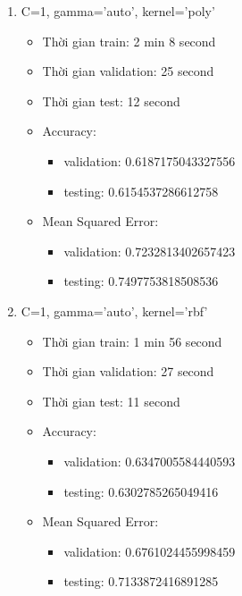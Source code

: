 \documentclass{article}
\begin{document}
\begin{enumerate}
	\item C=1, gamma='auto', kernel='poly'
	      \begin{itemize}
		      \item Thời gian train: 2 min 8 second
		      \item Thời gian validation: 25 second
		      \item Thời gian test: 12 second
		      \item Accuracy:
		            \begin{itemize}
			            \item validation: 0.6187175043327556
			            \item testing: 0.6154537286612758
		            \end{itemize}
		      \item Mean Squared Error:
		            \begin{itemize}
			            \item validation: 0.7232813402657423
			            \item testing: 0.7497753818508536
		            \end{itemize}
	      \end{itemize}
	\item C=1, gamma='auto', kernel='rbf'
	      \begin{itemize}
		      \item Thời gian train: 1 min 56 second
		      \item Thời gian validation: 27 second
		      \item Thời gian test: 11 second
		      \item Accuracy:
		            \begin{itemize}
			            \item validation: 0.6347005584440593
			            \item testing: 0.6302785265049416
		            \end{itemize}
		      \item Mean Squared Error:
		            \begin{itemize}
			            \item validation: 0.6761024455998459
			            \item testing: 0.7133872416891285
		            \end{itemize}
		            \begin{figure}[H]
			            \centering

\end{figure}
\end{itemize}
\end{enumerate}
\end{document}
